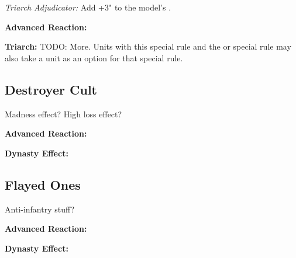 \textit{Triarch Adjudicator:} Add +3" to the model's .

\textbf{Advanced Reaction:}

\textbf{Triarch:} TODO: More. Units with this special rule and the  or  special rule may also take a  unit as an option for that special rule.


\subsection{Destroyer Cult}

Madness effect? High loss effect?

\textbf{Advanced Reaction:}

\textbf{Dynasty Effect:}


\subsection{Flayed Ones}

Anti-infantry stuff?

\textbf{Advanced Reaction:}

\textbf{Dynasty Effect:}
